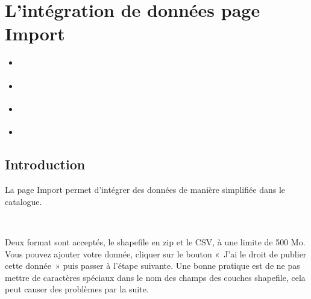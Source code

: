 \documentclass[letterpaper,10pt,french]{sphinxmanual}
\let\sphinxpxdimen\pdfpxdimen\else\newdimen\sphinxpxdimen
\begin{document}
\section{L’intégration de données \sphinxhyphen{} page Import}
\label{\detokenize{doc_user/import:l-integration-de-donnees-page-import}}\label{\detokenize{doc_user/import::doc}}
\begin{sphinxShadowBox}
\begin{itemize}
\item {} 
\sphinxAtStartPar
{}\label{\detokenize{doc_user/import:id1}}{\hyperref[\detokenize{doc_user/import:introduction}]{}}

\item {} 
\sphinxAtStartPar
{}\label{\detokenize{doc_user/import:id2}}{\hyperref[\detokenize{doc_user/import:integration-de-shapefile}]{}}

\item {} 
\sphinxAtStartPar
{}\label{\detokenize{doc_user/import:id3}}{\hyperref[\detokenize{doc_user/import:integration-de-csv}]{}}

\item {} 
\sphinxAtStartPar
{}\label{\detokenize{doc_user/import:id4}}{\hyperref[\detokenize{doc_user/import:processus-d-integration}]{}}

\end{itemize}
\end{sphinxShadowBox}


\subsection{Introduction}
\label{\detokenize{doc_user/import:introduction}}
\sphinxAtStartPar
La page Import permet d’intégrer des données de manière simplifiée dans le catalogue.

\noindent{\hspace*{\fill}\sphinxincludegraphics[width=600\sphinxpxdimen]{{import}.png}\hspace*{\fill}}

\sphinxAtStartPar
 

\sphinxAtStartPar
Deux format sont acceptés, le shapefile en zip et le CSV, à une limite de 500 Mo. Vous pouvez ajouter votre donnée, cliquer sur
le bouton « J’ai le droit de publier cette donnée » puis passer à l’étape suivante. Une bonne pratique est de ne pas mettre de caractères spéciaux
dans le nom des champs des couches shapefile, cela peut causer des problèmes par la suite.
\end{document}
